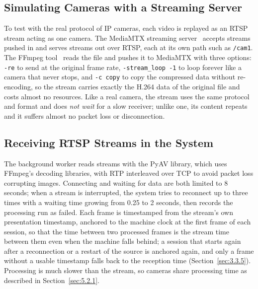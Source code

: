 \subsection{Simulating Cameras with a Streaming Server}
\label{sec:3.7.3}

To test with the real protocol of IP cameras, each video is replayed as an RTSP stream acting as one camera. The MediaMTX streaming server~\cite{mediamtx2026} accepts streams pushed in and serves streams out over RTSP, each at its own path such as \texttt{/cam1}. The FFmpeg tool~\cite{ffmpeg2026docs} reads the file and pushes it to MediaMTX with three options: \texttt{-re} to send at the original frame rate, \texttt{-stream\_loop -1} to loop forever like a camera that never stops, and \texttt{-c copy} to copy the compressed data without re-encoding, so the stream carries exactly the H.264 data of the original file and costs almost no resources. Like a real camera, the stream uses the same protocol and format and does \emph{not wait} for a slow receiver; unlike one, its content repeats and it suffers almost no packet loss or disconnection.

\subsection{Receiving RTSP Streams in the System}
\label{sec:3.7.4}

The background worker reads streams with the PyAV library, which uses FFmpeg's decoding libraries, with RTP interleaved over TCP to avoid packet loss corrupting images. Connecting and waiting for data are both limited to 8 seconds; when a stream is interrupted, the system tries to reconnect up to three times with a waiting time growing from 0.25 to 2 seconds, then records the processing run as failed. Each frame is timestamped from the stream's own presentation timestamp, anchored to the machine clock at the first frame of each session, so that the time between two processed frames is the stream time between them even when the machine falls behind; a session that starts again after a reconnection or a restart of the source is anchored again, and only a frame without a usable timestamp falls back to the reception time (Section~\ref{sec:3.3.5}). Processing is much slower than the stream, so cameras share processing time as described in Section~\ref{sec:5.2.1}.
